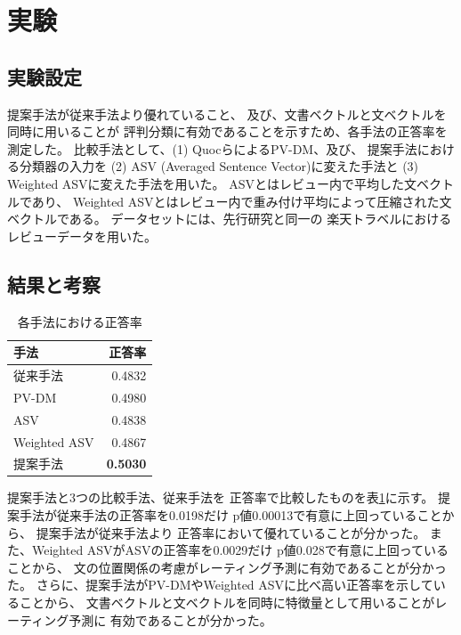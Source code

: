 \documentclass{ttisummary}
\begin{document}
\section{実験}

\subsection{実験設定}

提案手法が従来手法より優れていること、
及び、文書ベクトルと文ベクトルを同時に用いることが
評判分類に有効であることを示すため、各手法の正答率を測定した。
比較手法として、(1) Quocら\cite{quoc14}によるPV-DM、及び、
提案手法における分類器の入力を
(2) ASV (Averaged Sentence Vector)に変えた手法と
(3) Weighted ASVに変えた手法を用いた。
ASVとはレビュー内で平均した文ベクトルであり、
Weighted ASVとはレビュー内で重み付け平均によって圧縮された文ベクトルである。
データセットには、先行研究\cite{fujitani15}と同一の
楽天トラベルにおけるレビューデータを用いた。

\subsection{結果と考察}

\begin{table}[b!]
  \caption{各手法における正答率}
  \centering
  \begin{tabular}{l | r} \label{tab:Accuracies}
    手法 & 正答率 \\
    \hline
    従来手法\cite{fujitani15}  & 0.4832 \\
    PV-DM & 0.4980 \\
    ASV & 0.4838 \\
    Weighted ASV & 0.4867 \\
    提案手法 & \textbf{0.5030} \\
  \end{tabular}
\end{table}

提案手法と3つの比較手法、従来手法\cite{fujitani15}を
正答率で比較したものを表\ref{tab:Accuracies}に示す。
提案手法が従来手法\cite{fujitani15}の正答率を0.0198だけ
p値0.00013で有意に上回っていることから、
提案手法が従来手法\cite{fujitani15}より
正答率において優れていることが分かった。
また、Weighted ASVがASVの正答率を0.0029だけ
p値0.028で有意に上回っていることから、
文の位置関係の考慮がレーティング予測に有効であることが分かった。
さらに、提案手法がPV-DMやWeighted ASVに比べ高い正答率を示していることから、
文書ベクトルと文ベクトルを同時に特徴量として用いることがレーティング予測に
有効であることが分かった。
\end{document}
